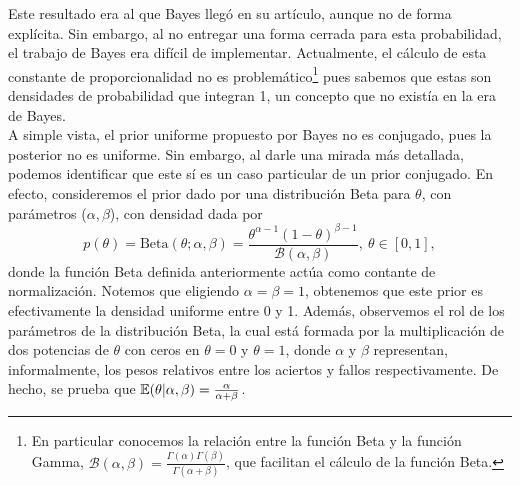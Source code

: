 Este resultado era al que Bayes llegó en su artículo, aunque no de forma explícita. Sin embargo, al no entregar una forma cerrada para esta probabilidad, el trabajo de Bayes era difícil de implementar. Actualmente, el cálculo de esta constante de proporcionalidad no es problemático\footnote{En particular conocemos la relación entre la función Beta y la función Gamma, $\mathcal{B}(\alpha,\beta) = \frac{\Gamma(\alpha)\Gamma(\beta)}{\Gamma(\alpha+\beta)}$, que facilitan el cálculo de la función Beta.} pues sabemos que estas son densidades de probabilidad que integran 1, un concepto que no existía en la era de Bayes. \\

A simple vista, el prior uniforme propuesto por Bayes no es conjugado, pues la posterior no es uniforme. Sin embargo, al darle una mirada más detallada, podemos identificar que este sí es un caso particular de un prior conjugado. En efecto, consideremos el prior dado por una distribución Beta para $\theta$, con parámetros ($\alpha, \beta$), con densidad dada por 
\begin{equation}
	p(\theta) = \text{Beta}(\theta;\alpha,\beta) = \frac{\theta^{\alpha-1}(1-\theta)^{\beta-1}}{\mathcal{B}(\alpha, \beta)},\ \theta\in [0,1],
	\label{eq:distribucion_beta}
\end{equation}
donde la función Beta definida anteriormente actúa como contante de normalización. Notemos que eligiendo $\alpha=\beta=1$, obtenemos que este prior es efectivamente la densidad uniforme entre 0 y 1. Además, observemos el rol de los parámetros de la distribución Beta, la cual está formada por la multiplicación de dos potencias de $\theta$ con ceros en $\theta=0$ y $\theta=1$, donde $\alpha$ y $\beta$ representan, informalmente, los pesos relativos entre los aciertos y fallos respectivamente. De hecho, se prueba que $\operatorname{\mathbb{E}}(\theta|\alpha,\beta) = \frac{\alpha}{\alpha + \beta}$.\\

